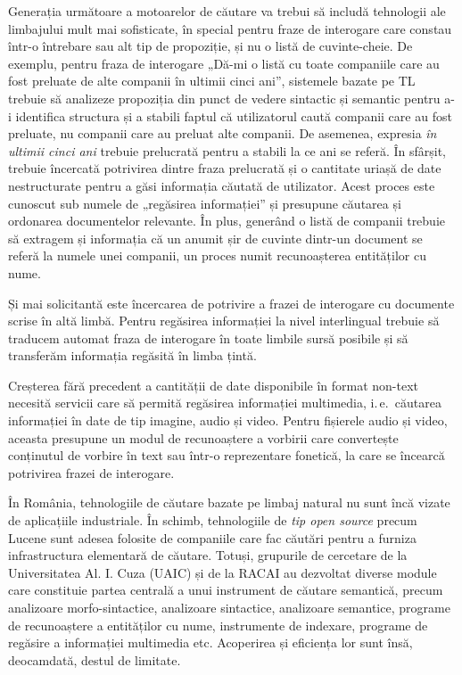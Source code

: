 \begin{multicols}{2}

Generația următoare a motoarelor de căutare va trebui să includă tehnologii ale limbajului mult mai sofisticate, în special pentru fraze de interogare care constau într-o întrebare sau alt tip de propoziție, și nu o listă de cuvinte-cheie. De exemplu, pentru fraza de interogare „Dă-mi o listă cu toate companiile care au fost preluate de alte companii în ultimii cinci ani”, sistemele bazate pe TL trebuie să analizeze propoziția din punct de vedere sintactic și semantic pentru a-i identifica structura și a stabili faptul că utilizatorul caută companii care au fost preluate, nu companii care au preluat alte companii. De asemenea, expresia \textit{în ultimii cinci ani} trebuie prelucrată pentru a stabili la ce ani se referă. În sfârșit, trebuie încercată potrivirea dintre fraza prelucrată și o cantitate uriașă de date nestructurate pentru a găsi informația căutată de utilizator. Acest proces este cunoscut sub numele de „regăsirea informației” și presupune căutarea și ordonarea documentelor relevante. În plus, generând o listă de companii trebuie să extragem și informația că un anumit șir de cuvinte dintr-un document se referă la numele unei companii, un proces numit recunoașterea entităților cu nume.

Și mai solicitantă este încercarea de potrivire a frazei de interogare cu documente scrise în altă limbă. Pentru regăsirea informației la nivel interlingual trebuie să traducem automat fraza de interogare în toate limbile sursă posibile și să transferăm informația regăsită în limba țintă. 

Creșterea fără precedent a cantității de date disponibile în format non-text necesită servicii care să permită regăsirea informației multimedia, i.\,e.~căutarea informației în date de tip imagine, audio și video. Pentru fișierele audio și video, aceasta presupune un modul de recunoaștere a vorbirii care convertește conținutul de vorbire în text sau într-o reprezentare fonetică, la care se încearcă potrivirea frazei de interogare.

În România, tehnologiile de căutare bazate pe limbaj natural nu sunt încă vizate de aplicațiile industriale. În schimb, tehnologiile de \textit{tip open source} precum Lucene sunt adesea folosite de companiile care fac căutări pentru a furniza infrastructura elementară de căutare. Totuși, grupurile de cercetare de la Universitatea Al. I. Cuza (UAIC) și de la RACAI au dezvoltat diverse module care constituie partea centrală a unui instrument de căutare semantică, precum analizoare morfo-sintactice, analizoare sintactice, analizoare semantice, programe de recunoaștere a entităților cu nume, instrumente de indexare, programe de regăsire a informației multimedia etc. Acoperirea și eficiența lor sunt însă, deocamdată,  destul de limitate.


\end{multicols}
